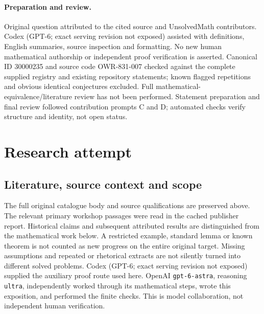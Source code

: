 \documentclass[11pt]{article}
\begin{document}
\paragraph{Preparation and review.}
Original question attributed to the cited source and UnsolvedMath contributors. Codex (GPT-6; exact serving revision not exposed) assisted with definitions, English summaries, source inspection and formatting. No new human mathematical authorship or independent proof verification is asserted. Canonical ID 30000235 and source code OWR-831-007 checked against the complete supplied registry and existing repository statements; known flagged repetitions and obvious identical conjectures excluded. Full mathematical-equivalence/literature review has not been performed. Statement preparation and final review followed contribution prompts C and D; automated checks verify structure and identity, not open status.
\label{end:30000235}

\section{Research attempt}
\subsection{Literature, source context and scope}
The full original catalogue body and source qualifications are preserved above. The relevant primary workshop passages were read in the cached publisher report. Historical claims and subsequent attributed results are distinguished from the mathematical work below. A restricted example, standard lemma or known theorem is not counted as new progress on the entire original target. Missing assumptions and repeated or rhetorical extracts are not silently turned into different solved problems.
Codex (GPT-6; exact serving revision not exposed) supplied the auxiliary proof route used here. OpenAI \texttt{gpt-6-astra}, reasoning \texttt{ultra}, independently worked through its mathematical steps, wrote this exposition, and performed the finite checks. This is model collaboration, not independent human verification.
\end{document}
